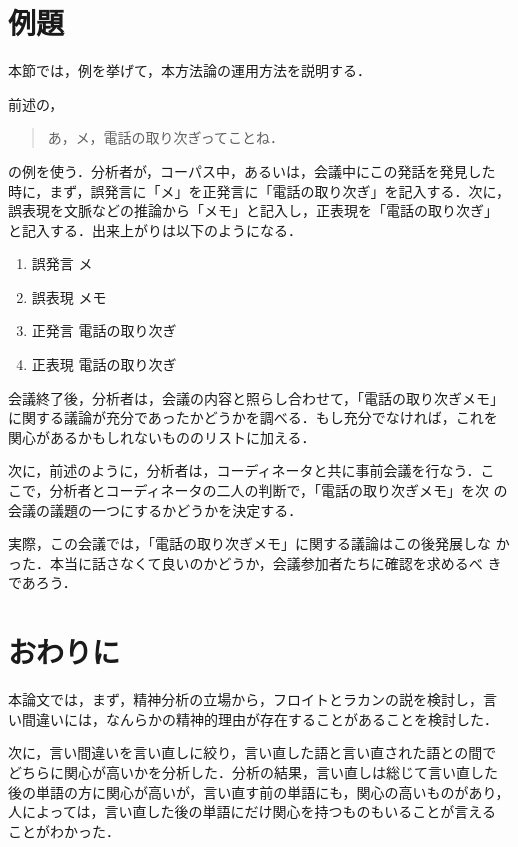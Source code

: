 \section{例題}

本節では，例を挙げて，本方法論の運用方法を説明する．

前述の，

\begin{quote}
あ，メ，電話の取り次ぎってことね．
\end{quote}

の例を使う．分析者が，コーパス中，あるいは，会議中にこの発話を発見した
時に，まず，誤発言に「メ」を正発言に「電話の取り次ぎ」を記入する．次に，
誤表現を文脈などの推論から「メモ」と記入し，正表現を「電話の取り次ぎ」
と記入する．出来上がりは以下のようになる．

\begin{enumerate}
\item 誤発言 メ
\item 誤表現 メモ
\item 正発言 電話の取り次ぎ
\item 正表現 電話の取り次ぎ
\end{enumerate}

会議終了後，分析者は，会議の内容と照らし合わせて，「電話の取り次ぎメモ」
に関する議論が充分であったかどうかを調べる．もし充分でなければ，これを
関心があるかもしれないもののリストに加える．

次に，前述のように，分析者は，コーディネータと共に事前会議を行なう．こ
こで，分析者とコーディネータの二人の判断で，「電話の取り次ぎメモ」を次
の会議の議題の一つにするかどうかを決定する．

実際，この会議では，「電話の取り次ぎメモ」に関する議論はこの後発展しな
かった．本当に話さなくて良いのかどうか，会議参加者たちに確認を求めるべ
きであろう．

\section{おわりに}

本論文では，まず，精神分析の立場から，フロイトとラカンの説を検討し，言
い間違いには，なんらかの精神的理由が存在することがあることを検討した．

次に，言い間違いを言い直しに絞り，言い直した語と言い直された語との間で
どちらに関心が高いかを分析した．分析の結果，言い直しは総じて言い直した
後の単語の方に関心が高いが，言い直す前の単語にも，関心の高いものがあり，
人によっては，言い直した後の単語にだけ関心を持つものもいることが言える
ことがわかった．

